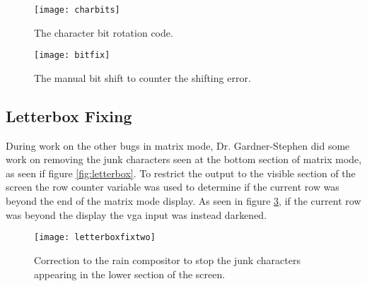 \begin{figure}
  \centering
  \texttt{[image: charbits]}
  \caption{The character bit rotation code.}
  \label{fig:charbits}
\end{figure}

\begin{figure}
  \centering
  \texttt{[image: bitfix]}
  \caption{The manual bit shift to counter the shifting error.}
  \label{fig:bitfix}
\end{figure}


\subsection{Letterbox Fixing}

\label{Ch5 Sec3 Sub4}

During work on the other bugs in matrix mode, Dr. Gardner-Stephen did some work on removing the junk characters seen at the bottom section of matrix mode, as seen if figure \ref{fig:letterbox}. To restrict the output to the visible section of the screen the row counter variable was used to determine if the current row was beyond the end of the matrix mode display. As seen in figure \ref{fig:letterboxfixtwo}, if the current row was beyond the display the vga input was instead darkened.

\begin{figure}
  \centering
  \texttt{[image: letterboxfixtwo]}
  \caption{Correction to the rain compositor to stop the junk characters appearing in the lower section of the screen.}
  \label{fig:letterboxfixtwo}
\end{figure}
